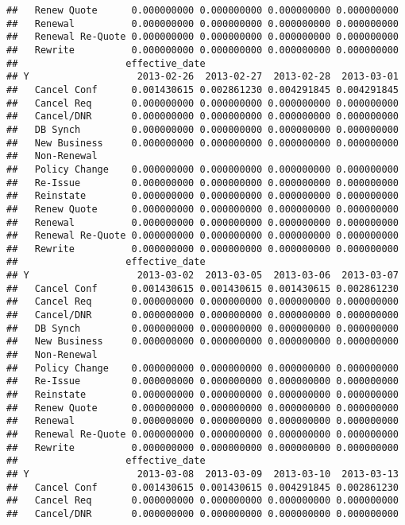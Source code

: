 \documentclass[]{article}
\begin{document}
\begin{verbatim}
##   Renew Quote      0.000000000 0.000000000 0.000000000 0.000000000
##   Renewal          0.000000000 0.000000000 0.000000000 0.000000000
##   Renewal Re-Quote 0.000000000 0.000000000 0.000000000 0.000000000
##   Rewrite          0.000000000 0.000000000 0.000000000 0.000000000
##                   effective_date
## Y                   2013-02-26  2013-02-27  2013-02-28  2013-03-01
##   Cancel Conf      0.001430615 0.002861230 0.004291845 0.004291845
##   Cancel Req       0.000000000 0.000000000 0.000000000 0.000000000
##   Cancel/DNR       0.000000000 0.000000000 0.000000000 0.000000000
##   DB Synch         0.000000000 0.000000000 0.000000000 0.000000000
##   New Business     0.000000000 0.000000000 0.000000000 0.000000000
##   Non-Renewal                                                     
##   Policy Change    0.000000000 0.000000000 0.000000000 0.000000000
##   Re-Issue         0.000000000 0.000000000 0.000000000 0.000000000
##   Reinstate        0.000000000 0.000000000 0.000000000 0.000000000
##   Renew Quote      0.000000000 0.000000000 0.000000000 0.000000000
##   Renewal          0.000000000 0.000000000 0.000000000 0.000000000
##   Renewal Re-Quote 0.000000000 0.000000000 0.000000000 0.000000000
##   Rewrite          0.000000000 0.000000000 0.000000000 0.000000000
##                   effective_date
## Y                   2013-03-02  2013-03-05  2013-03-06  2013-03-07
##   Cancel Conf      0.001430615 0.001430615 0.001430615 0.002861230
##   Cancel Req       0.000000000 0.000000000 0.000000000 0.000000000
##   Cancel/DNR       0.000000000 0.000000000 0.000000000 0.000000000
##   DB Synch         0.000000000 0.000000000 0.000000000 0.000000000
##   New Business     0.000000000 0.000000000 0.000000000 0.000000000
##   Non-Renewal                                                     
##   Policy Change    0.000000000 0.000000000 0.000000000 0.000000000
##   Re-Issue         0.000000000 0.000000000 0.000000000 0.000000000
##   Reinstate        0.000000000 0.000000000 0.000000000 0.000000000
##   Renew Quote      0.000000000 0.000000000 0.000000000 0.000000000
##   Renewal          0.000000000 0.000000000 0.000000000 0.000000000
##   Renewal Re-Quote 0.000000000 0.000000000 0.000000000 0.000000000
##   Rewrite          0.000000000 0.000000000 0.000000000 0.000000000
##                   effective_date
## Y                   2013-03-08  2013-03-09  2013-03-10  2013-03-13
##   Cancel Conf      0.001430615 0.001430615 0.004291845 0.002861230
##   Cancel Req       0.000000000 0.000000000 0.000000000 0.000000000
##   Cancel/DNR       0.000000000 0.000000000 0.000000000 0.000000000

\end{verbatim}
\end{document}
